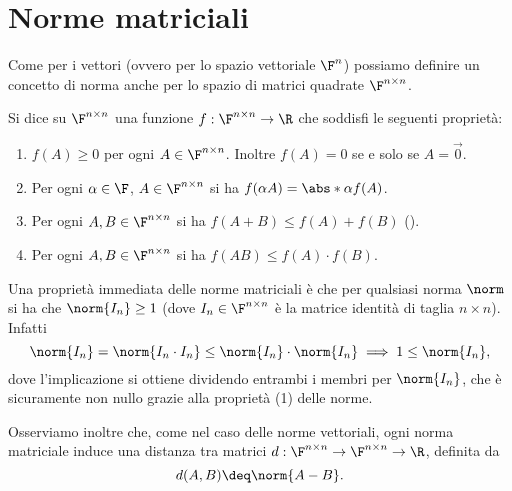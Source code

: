 \section{Norme matriciali}

Come per i vettori (ovvero per lo spazio vettoriale $\F^n$) possiamo definire un concetto di norma anche per lo spazio di matrici quadrate $\Mat{\F, n, n}$.

\begin{definition}
    Si dice  su $\Mat{\F, n, n}$ una funzione $f : \Mat{\F, n, n} \to \R$ che soddisfi le seguenti proprietà: 
    \begin{enumerate}[(1)]
        \item $f(A) \geq 0$ per ogni $A \in \Mat{\F, n, n}$. Inoltre $f(A) = 0$ se e solo se $A = \vec 0$.
        \item Per ogni $\alpha \in \F$, $A \in \Mat{\F, n, n}$ si ha $f(\alpha A) = \abs*{\alpha}f(A)$.
        \item Per ogni $A, B \in \Mat{\F, n, n}$ si ha $f(A + B) \leq f(A) + f(B)$ ().
        \item Per ogni $A, B \in \Mat{\F, n, n}$ si ha $f(AB) \leq f(A) \cdot f(B)$. 
    \end{enumerate} 
\end{definition}

Una proprietà immediata delle norme matriciali è che per qualsiasi norma $\norm$ si ha che $\norm{I_n} \geq 1$ (dove $I_n \in \Mat{\F, n, n}$ è la matrice identità di taglia $n \times n$). Infatti \[
    \norm{I_n} = \norm{I_n \cdot I_n} \leq \norm{I_n} \cdot \norm{I_n} \implies 1 \leq \norm{I_n},
\] dove l'implicazione si ottiene dividendo entrambi i membri per $\norm{I_n}$, che è sicuramente non nullo grazie alla proprietà (1) delle norme.

Osserviamo inoltre che, come nel caso delle norme vettoriali, ogni norma matriciale induce una distanza tra matrici $d : \Mat{\F, n, n} \to \Mat{\F, n, n} \to \R$, definita da \[
    d(A, B) \deq \norm{A - B}.
\]